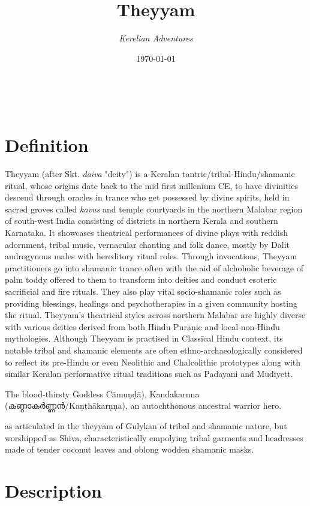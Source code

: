 \documentclass[a4paper, 11pt]{article} %
\title{\textbf{Theyyam}} %
\author{\textit{Kerelian Adventures}} %
\date{\today} %
\makeatletter
\renewcommand{\maketitle}{ %
\begin{flushright} %
{\LARGE\@title} %

\vspace{10pt} %

{\@author} %
\\\@date %

\vspace{30pt} %
\end{flushright}
}
\makeatother
\begin{document}
\maketitle %

\thispagestyle{empty}


\section{Definition}
  \label{sec:Definition}

Theyyam (after Skt. \textit{daiva} "deity") is a Keralan tantric/tribal-Hindu/shamanic ritual, whose origins date back to the mid first millenium CE, to have divinities descend through oracles in trance who get possessed by divine spirits, held in sacred groves called \textit{kavus} and temple courtyards in the northern Malabar region of south-west India consisting of districts in northern Kerala and southern Karnataka. It showcases theatrical performances of divine plays with reddish adornment, tribal music, vernacular chanting and folk dance, mostly by Dalit androgynous males with hereditory ritual roles. Through invocations, Theyyam practitioners go into shamanic trance often with the aid of alchoholic beverage of palm toddy offered to them to transform into deities and conduct esoteric sacrificial and fire rituals. They also play vital socio-shamanic roles such as providing blessings, healings and psychotherapies in a given community hosting the ritual. Theyyam's theatrical styles across northern Malabar are highly diverse with various deities derived from both Hindu Purāṇic and local non-Hindu mythologies. Although Theyyam is practised in Classical Hindu context, its notable tribal and shamanic elements are often ethno-archaeologically considered to reflect its pre-Hindu or even Neolithic and Chalcolithic prototypes along with similar Keralan performative ritual traditions such as Padayani and Mudiyett.


The blood-thirsty Goddess Cāmuṇḍā), Kandakarnna (കണ്ഠാകർണ്ണൻ/Kaṇṭhākarṇṇa), an autochthonous ancestral warrior hero. 


as articulated in the theyyam of Gulykan of tribal and shamanic nature, but worshipped as Shiva, characteristically empolying tribal garments and headresses made of tender coconut leaves and oblong wodden shamanic masks.

\section{Description}%
  \label{sec:Description}
  
\end{document}
